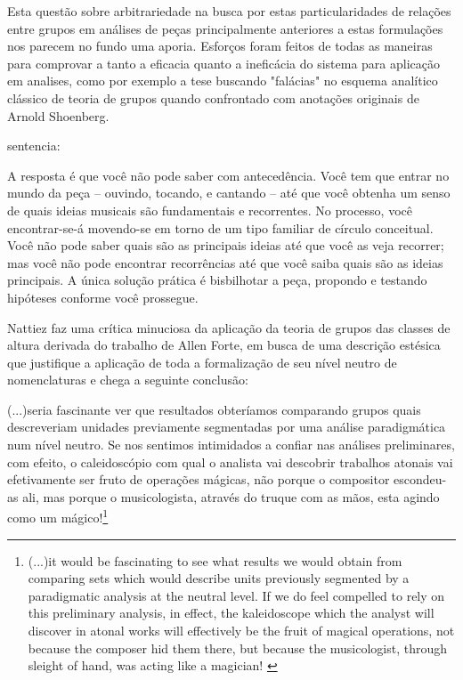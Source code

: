 \documentclass[
	12pt,				%
	openright,			%
	twoside,			%
	a4paper,			%
	english,			%
	french,				%
	spanish,			%
	brazil				%
	]{abntex2}
\begin{document}
Esta questão sobre arbitrariedade na busca por estas particularidades de relações entre grupos em análises de peças principalmente anteriores a estas formulações nos parecem no fundo uma aporia. Esforços foram feitos de todas as maneiras para comprovar a tanto a eficacia quanto a ineficácia do sistema para aplicação em analises, como por exemplo a tese  buscando "falácias" no esquema analítico clássico de teoria de grupos quando confrontado com anotações originais de Arnold Shoenberg.

\cite{straus2004} sentencia:

\begin{citacao}
A resposta é que você não pode saber com antecedência.
Você tem que entrar no mundo da peça – ouvindo, tocando, e cantando – até que você
obtenha um senso de quais ideias musicais são fundamentais e recorrentes. No processo,
você encontrar-se-á movendo-se em torno de um tipo familiar de círculo conceitual. Você
não pode saber quais são as principais ideias até que você as veja recorrer; mas você não
pode encontrar recorrências até que você saiba quais são as ideias principais. A única
solução prática é bisbilhotar a peça, propondo e testando hipóteses conforme você
prossegue. 
\cite{straus2004}
\end{citacao}

Nattiez\cite{nattiez2003allen} faz uma crítica minuciosa da aplicação da teoria de grupos das classes de altura derivada do trabalho de Allen Forte, em busca de uma descrição estésica que justifique a aplicação de toda a formalização de seu nível neutro de nomenclaturas e chega a seguinte conclusão:


\begin{citacao}
(...)seria fascinante ver que resultados obteríamos comparando grupos quais descreveriam unidades previamente segmentadas por uma análise paradigmática num nível neutro. Se nos sentimos intimidados a confiar nas análises preliminares, com efeito, o caleidoscópio com qual o analista vai descobrir trabalhos atonais vai efetivamente ser fruto de operações mágicas, não porque o compositor escondeu-as ali, mas porque o musicologista, através do truque com as mãos, esta agindo como um mágico!\cite[ p.16]{nattiez2003allen}\footnote{(...)it would be fascinating to see what results we would obtain from comparing sets which would describe units previously segmented by a paradigmatic analysis at the neutral level. If we do feel compelled to rely on this preliminary analysis, in effect, the kaleidoscope which the analyst will discover in atonal works will effectively be the fruit of magical operations, not because the composer hid them there, but because the musicologist, through sleight of hand, was acting like a magician!
\cite[ p.16]{nattiez2003allen}}
\end{citacao}
\end{document}
